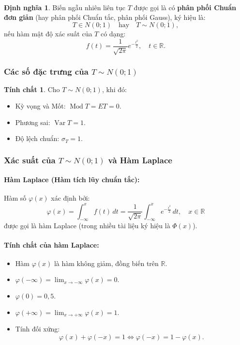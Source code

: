 \documentclass[12pt,a4paper]{article}
\theoremstyle{definition}
\newtheorem{dinhnghia}{Định nghĩa}[section]
\newtheorem{tinhchat}{Tính chất}[section]
\begin{document}
\begin{dinhnghia}
Biến ngẫu nhiên liên tục $T$ được gọi là có \textbf{phân phối Chuẩn đơn giản} (hay phân phối Chuẩn tắc, phân phối Gauss), ký hiệu là:
\[
T \in N(0; 1) \quad \text{hay} \quad T \sim N(0; 1),
\]
nếu hàm mật độ xác suất của $T$ có dạng:
\[
f(t) = \frac{1}{\sqrt{2\pi}} e^{-\frac{t^2}{2}}, \quad t \in \mathbb{R}.
\]
\end{dinhnghia}

\subsubsection{Các số đặc trưng của \texorpdfstring{$T \sim N(0; 1)$}{T ~ N(0; 1)}}

\begin{tinhchat}
Cho $T \sim N(0; 1)$, khi đó:
\begin{itemize}
    \item Kỳ vọng và Mốt: $\operatorname{Mod} T = ET = 0$.
    \item Phương sai: $\operatorname{Var} T = 1$.
    \item Độ lệch chuẩn: $\sigma_T = 1$.
\end{itemize}
\end{tinhchat}

\subsubsection{Xác suất của \texorpdfstring{$T \sim N(0; 1)$}{T ~ N(0; 1)} và Hàm Laplace}

\paragraph{Hàm Laplace (Hàm tích lũy chuẩn tắc):}
Hàm số $\varphi(x)$ xác định bởi:
\[
\varphi(x) = \int_{-\infty}^x f(t)\,dt = \frac{1}{\sqrt{2\pi}} \int_{-\infty}^x e^{-\frac{t^2}{2}}\,dt, \quad x \in \mathbb{R}
\]
được gọi là hàm Laplace (trong nhiều tài liệu ký hiệu là $\Phi(x)$).

\paragraph{Tính chất của hàm Laplace:}
\begin{itemize}
    \item Hàm $\varphi(x)$ là hàm không giảm, đồng biến trên $\mathbb{R}$.
    \item $\varphi(-\infty) = \lim_{x \to -\infty} \varphi(x) = 0$.
    \item $\varphi(0) = 0{,}5$.
    \item $\varphi(+\infty) = \lim_{x \to +\infty} \varphi(x) = 1$.
    \item Tính đối xứng:
    \[
    \varphi(x) + \varphi(-x) = 1 \iff \varphi(-x) = 1 - \varphi(x).
    \]
\end{itemize}
\end{document}
